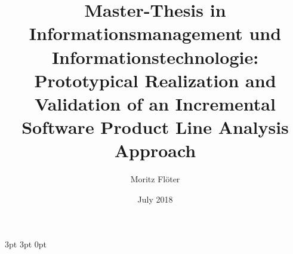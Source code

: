 \documentclass[a4paper]{article}
\title{\large Master-Thesis in Informationsmanagement und Informationstechnologie: \\ \Huge Prototypical Realization and Validation of an Incremental Software Product Line Analysis Approach}
\author{Moritz Fl\"oter}
\date{July 2018}
\begin{document}


  {3pt}%
  {3pt}%
  {\normalfont}%
  {0pt}%
  {\bfseries}%
  {}%
  {\newline}%
  {}%

\theoremstyle{mystyle}


\newtheorem{req}{REQ}
\newtheorem{subreq}{REQ}[req]
\newtheorem{subsubreq}{REQ}[subreq]
\setcounter{req}{0}

\newcommand*{\reqtable}[4]{
\begin{tabular}{ | p{0.15\textwidth} | p{0.79\textwidth} | }
	\hline
	\textit{Priority} & \begin{minipage}[l]{0.79\textwidth}
	\vspace{0.25em}
		#1
	\vspace{0.25em}
	\end{minipage} \\ \hline
	\textit{Source} & \begin{minipage}[l]{0.79\textwidth}
	\vspace{0.25em}
		#2
	\vspace{0.25em}
	\end{minipage}\\ \hline
	\textit{Description} & \begin{minipage}[l]{0.79\textwidth}
	\vspace{0.25em}
		#3
	\vspace{0.25em}
	\end{minipage} \\ \hline
	\textit{Explanation} & \begin{minipage}[l]{0.79\textwidth} 
	\vspace{0.25em}
		#4
	\vspace{0.25em}
	\end{minipage} \\
	\hline
\end{tabular}
}



\maketitle
\newblock
\end{document}
